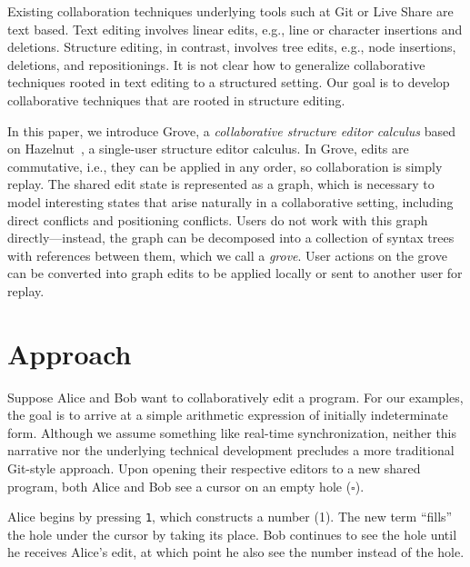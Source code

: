 \documentclass[nonacm, acmsmall, screen, review]{acmart}
\newcommand{\hole}{\ensuremath{\square}} %
\newcommand{\kbinput}[1]{\texttt{#1}}
\begin{document}
Existing collaboration techniques underlying tools such at Git or Live Share are text based.
Text editing involves linear edits, e.g., line or character insertions and deletions.
Structure editing, in contrast, involves tree edits, e.g., node insertions, deletions, and repositionings.
It is not clear how to generalize collaborative techniques rooted in text editing to a structured setting.
Our goal is to develop collaborative techniques that are rooted in structure editing.

In this paper, we introduce Grove, a \emph{collaborative structure editor calculus} based on Hazelnut~\cite{omar_hazelnut_2017}, a single-user structure editor calculus.
In Grove, edits are commutative, i.e., they can be applied in any order, so collaboration is simply replay.
The shared edit state is represented as a graph, which is necessary to model interesting states that arise naturally in a collaborative setting, 
including direct conflicts and positioning conflicts. 
Users do not work with this graph directly---instead, the graph can be decomposed into a collection of syntax trees with references between them, which we call a \emph{grove}.
User actions on the grove can be converted into graph edits to be applied locally or sent to another user for replay.


\section{Approach}

Suppose Alice and Bob want to collaboratively edit a program.
For our examples, the goal is to arrive at a simple arithmetic expression of initially indeterminate form.
Although we assume something like real-time synchronization,
neither this narrative nor the underlying technical development precludes a more traditional Git-style approach.
Upon opening their respective editors to a new shared program,
both Alice and Bob see a cursor on an empty hole ($\hole$).

Alice begins by pressing \kbinput{1}, which constructs a number (1).
The new term ``fills'' the hole under the cursor by taking its place.
Bob continues to see the hole until he receives Alice's edit,
at which point he also see the number instead of the hole.
\end{document}
